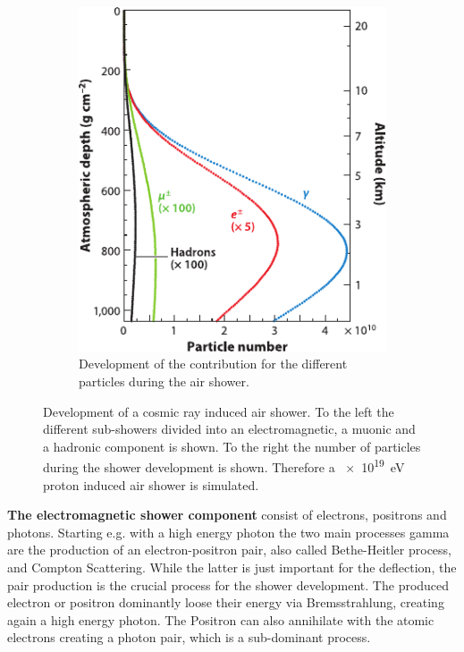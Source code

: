 \begin{figure}
\begin{subfigure}[t]{0.47\textwidth}
        \includegraphics[width=\textwidth]{./images/air_shower_development.pdf}
        \caption{Development of the contribution for the different particles during the air shower. \cite{Engel11EAS}}
        \label{fig:air_shower_development}
    \end{subfigure}
    \caption{Development of a cosmic ray induced air shower. To the left the different sub-showers divided into an electromagnetic, a muonic and a hadronic component is shown. To the right the number of particles during the shower development is shown. Therefore a \SI{e19}{eV} proton induced air shower is simulated.}
    \label{fig:air_shower}
\end{figure}

\textbf{The electromagnetic shower component} consist of electrons, positrons and photons.
Starting e.g. with a high energy photon the two main processes gamma are the production of an electron-positron pair, also called Bethe-Heitler process, and Compton Scattering.
While the latter is just important for the deflection, the pair production is the crucial process for the shower development.
The produced electron or positron dominantly loose their energy via Bremsstrahlung, creating again a high energy photon.
The Positron can also annihilate with the atomic electrons creating a photon pair, which is a sub-dominant process.

